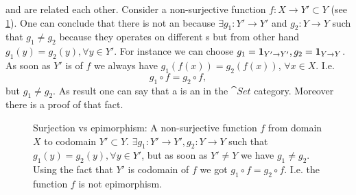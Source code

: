 \begin{remark}
  \label{rem:surjection_epimorphism}
   and  are
  related each other. Consider a non-surjective function $f: X
  \rightarrow Y' \subset Y$ (see \cref{fig:surjection_epimorphism}). One can
  conclude that there is not an  because  
  $\exists g_1: Y' \to Y'$ and  $g_2 : Y \to Y$ such
  that $g_1 \ne g_2$ because they operates on different
  s but from other hand $g_1(y) = g_2(y),
  \forall y \in Y'$. For
  instance we can choose $g_1 = \mathbf{1}_{ Y' \to Y' }, g_2=\mathbf{1}_{ Y \to Y }$. As
  soon as $Y'$ is  of $f$ we always have
  $g_1(f(x)) = g_2(f(x))$, $\forall x \in X$. I.e. 
  \[
  g_1 \circ f = g_2 \circ f,
  \]
  but $g_1 \ne g_2$. As result one can say that a
   is an 
   in the $\cat{Set}$ category. Moreover
  there is a proof 
  \cite{bib:proofwiki:Surjection_iff_Epimorphism_in_Category_of_Sets}
  of that fact.

\begin{figure}[H]
  \centering
  \caption{Surjection vs epimorphism: A non-surjective function $f$ from domain $X$ to
    codomain $Y' \subset Y$.
    $\exists g_1: Y' \rightarrow Y', g_2: Y \rightarrow Y$ such that
    $g_1(y) = g_2(y), \forall y \in Y'$, but as soon as $Y' 
    \ne Y$ we have $g_1 \ne g_2$. Using the fact that $Y'$ is codomain
    of $f$ we got $g_1 \circ f = g_2 \circ f$.
    I.e. the function $f$ is not epimorphism. }
  \label{fig:surjection_epimorphism}
\end{figure}
\end{remark}


